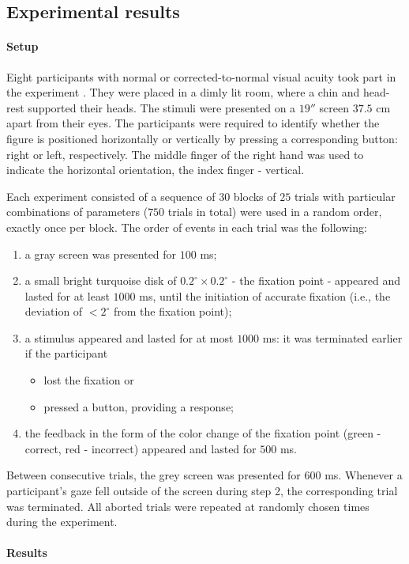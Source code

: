 \subsection{Experimental results}

\paragraph{Setup}

Eight participants with normal or corrected-to-normal visual acuity took part in the experiment \cite{MaryamPLACEHOLDER}. They were placed in a dimly lit room, where a chin and head-rest supported their heads. The stimuli were presented on a $19''$ screen $37.5$ cm apart from their eyes. The participants were required to identify whether the figure is positioned horizontally or vertically by pressing a corresponding button: right or left, respectively. The middle finger of the right hand was used to indicate the horizontal orientation, the index finger - vertical.

Each experiment consisted of a sequence of $30$ blocks of $25$ trials with particular combinations of parameters ($750$ trials in total) were used in a random order, exactly once per block. The order of events in each trial was the following:
\begin{enumerate}
    \item a gray screen was presented for $100$ ms;
    
    \item a small bright turquoise disk of $0.2^\circ \times 0.2^\circ$ - the fixation point - appeared and lasted for at least $1000$ ms, until the initiation of accurate fixation (i.e., the deviation of $< 2^\circ$ from the fixation point);
    
    \item a stimulus appeared and lasted for at most $1000$ ms: it was terminated earlier if the participant
    \begin{itemize}
        \item lost the fixation or
        \item pressed a button, providing a response;
    \end{itemize}
    
    \item the feedback in the form of the color change of the fixation point (green - correct, red - incorrect) appeared and lasted for $500$ ms.
\end{enumerate}
Between consecutive trials, the grey screen was presented for $600$ ms.  Whenever a participant's gaze fell outside of the screen during step 2, the corresponding trial was terminated. All aborted trials were repeated at randomly chosen times during the experiment.


\paragraph{Results}

